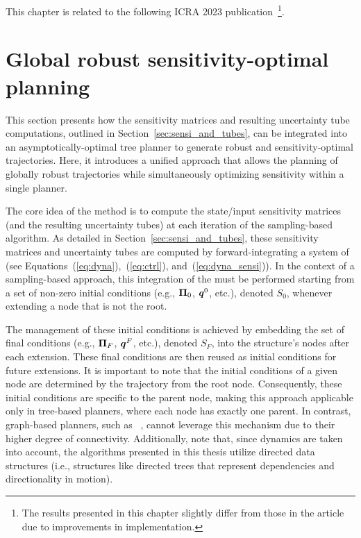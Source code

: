 This chapter is related to the following ICRA 2023 publication~\cite{cSAMP}\footnote{The results presented in this chapter slightly differ from those in the article due to improvements in implementation.}.

\section{Global robust sensitivity-optimal planning}\label{sec:samp}

This section presents how the sensitivity matrices and resulting uncertainty tube computations, outlined in Section~\ref{sec:sensi_and_tubes}, can be integrated into an asymptotically-optimal tree planner to generate robust and sensitivity-optimal trajectories. 
Here, it introduces a unified approach that allows the planning of globally robust trajectories while simultaneously optimizing sensitivity within a single planner.

The core idea of the method is to compute the state/input sensitivity matrices (and the resulting uncertainty tubes) at each iteration of the sampling-based algorithm. 
As detailed in Section~\ref{sec:sensi_and_tubes}, these sensitivity matrices and uncertainty tubes are computed by forward-integrating a system of  (see Equations~(\ref{eq:dyna}),~(\ref{eq:ctrl}), and~(\ref{eq:dyna_sensi})). 
In the context of a sampling-based approach, this integration of the  must be performed starting from a set of non-zero initial conditions (e.g., $\boldsymbol{\Pi}_0$, $\boldsymbol{q}^0$, etc.), denoted $S_0$, whenever extending a node that is not the root.

The management of these initial conditions is achieved by embedding the set of final conditions (e.g., $\boldsymbol{\Pi}_F$, $\boldsymbol{q}^F$, etc.), denoted $S_F$, into the structure's nodes after each extension. 
These final conditions are then reused as initial conditions for future extensions. 
It is important to note that the initial conditions of a given node are determined by the trajectory from the root node. 
Consequently, these initial conditions are specific to the parent node, making this approach applicable only in tree-based planners, where each node has exactly one parent. 
In contrast, graph-based planners, such as ~\cite{cPRM}, cannot leverage this mechanism due to their higher degree of connectivity.
Additionally, note that, since dynamics are taken into account, the algorithms presented in this thesis utilize directed data structures (i.e., structures like directed trees that represent dependencies and directionality in motion).

